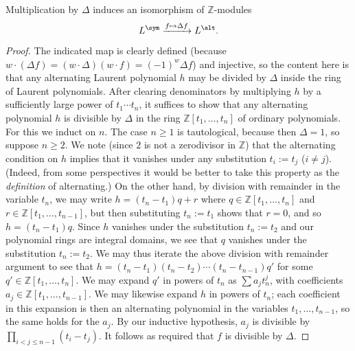 \documentclass[reqno]{amsart} 
\begin{document}
\begin{lemma}
  Multiplication by $\Delta$ induces an isomorphism of $\mathbb{Z}$-modules
  \begin{equation*}
    L^{\sym} \xrightarrow{f \mapsto \Delta f} L^{\alt}.
  \end{equation*}
\end{lemma}
\begin{proof}
  The indicated map is clearly defined (because $w \cdot (\Delta f) = (w \cdot \Delta) (w \cdot f) = (-1)^w \Delta f$) and injective, so the content here is that any alternating Laurent polynomial $h$ may be divided by $\Delta$ inside the ring of Laurent polynomials.  After clearing denominators by multiplying $h$ by a sufficiently large power of $t_1 \dotsb t_n$, it suffices to show that any alternating polynomial $h$ is divisible by $\Delta$ in the ring $\mathbb{Z}[t_1,\dotsc,t_n]$ of ordinary polynomials.  For this we induct on $n$.  The case $n \geq 1$ is tautological, because then $\Delta = 1$, so suppose $n \geq 2$.  We note (since $2$ is not a zerodivisor in $\mathbb{Z}$) that the alternating condition on $h$ implies that it vanishes under any substitution $t_i := t_j$ ($i \neq j$).  (Indeed, from some perspectives it would be better to take this property as the \emph{definition} of alternating.)  On the other hand, by division with remainder in the variable $t_n$, we may write $h = (t_n - t_1) q + r$ where $q \in \mathbb{Z}[t_1,\dotsc,t_n]$ and $r \in \mathbb{Z}[t_1,\dotsc,t_{n-1}]$, but then substituting $t_n := t_1$ shows that $r = 0$, and so $h = (t_n - t_1) q$.  Since $h$ vanishes under the substitution $t_n := t_2$ and our polynomial rings are integral domains, we see that $q$ vanishes under the substitution $t_n := t_2$.  We may thus iterate the above division with remainder argument to see that $h = (t_n - t_1) (t_n - t_2) \dotsb (t_n - t_{n-1}) q'$ for some $q' \in \mathbb{Z}[t_1,\dotsc,t_n]$.  We may expand $q '$ in powers of $t_n$ as $\sum a_j t_n^j$, with coefficients $a_j \in \mathbb{Z}[t_1,\dotsc,t_{n-1}]$.  We may likewise expand $h$ in powers of $t_n$; each coefficient in this expansion is then an alternating polynomial in the variables $t_1,\dotsc,t_{n-1}$, so the same holds for the $a_j$.  By our inductive hypothesis, $a_j$ is divisible by $\prod_{i < j \leq n-1} (t_i - t_j)$.  It follows as required that $f$ is divisible by $\Delta$.
\end{proof}
\end{document}
